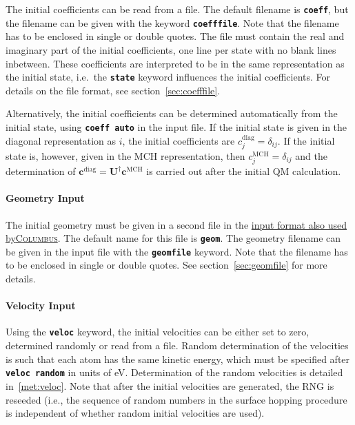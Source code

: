 \documentclass[a4paper,11pt,DIV=15,openany,twoside=false]{scrbook}
\newcommand{\ttt}[1]{\textbf{\texttt{#1}}}
\newcommand{\VEC}[1]{\ensuremath{\mathbf{#1}}}
\begin{document}
The initial coefficients can be read from a file. The default filename is \ttt{coeff}, but the filename can be given with the keyword \ttt{coefffile}. Note that the filename has to be enclosed in single or double quotes. The file must contain the real and imaginary part of the initial coefficients, one line per state with no blank lines inbetween. These coefficients are interpreted to be in the same representation as the initial state, i.e.\ the \ttt{state} keyword influences the initial coefficients. For details on the file format, see section~\ref{sec:coefffile}.

Alternatively, the initial coefficients can be determined automatically from the initial state, using \ttt{coeff auto} in the input file. If the initial state is given in the diagonal representation as $i$, the initial coefficients are $c^{\text{diag}}_j=\delta_{ij}$. If the initial state is, however, given in the MCH representation, then $c^{\text{MCH}}_j=\delta_{ij}$ and the determination of $\VEC{c}^{\text{diag}}=\VEC{U}^\dagger\VEC{c}^{\text{MCH}}$ is carried out after the initial QM calculation. 

\paragraph{Geometry Input}

The initial geometry must be given in a second file in the  \href{http://www.univie.ac.at/columbus/docs_COL70/documentation_main.html}{input format also used by\textsc{Columbus}}. The default name for this file is \ttt{geom}. The geometry filename can be given in the input file with the \ttt{geomfile} keyword. Note that the filename has to be enclosed in single or double quotes. See section~\ref{sec:geomfile} for more details.

\paragraph{Velocity Input}

Using the \ttt{veloc} keyword, the initial velocities can be either set to zero, determined randomly or read from a file. Random determination of the velocities is such that each atom has the same kinetic energy, which must be specified after \ttt{veloc random} in units of eV. Determination of the random velocities is detailed in~\ref{met:veloc}. Note that after the initial velocities are generated, the RNG is reseeded (i.e., the sequence of random numbers in the surface hopping procedure is independent of whether random initial velocities are used).
\end{document}
